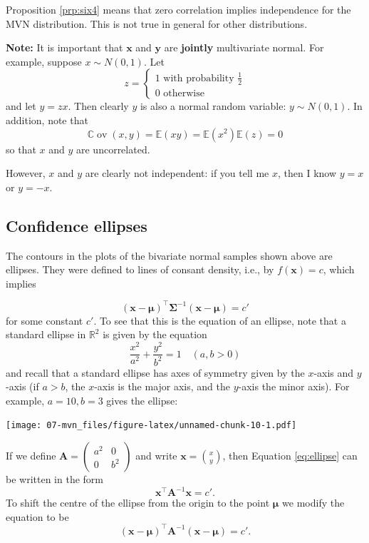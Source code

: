 \documentclass[]{book}
\theoremstyle{definition}
\theoremstyle{definition}
\theoremstyle{definition}
\theoremstyle{remark}
\begin{document}
Proposition \ref{prp:six4} means that zero correlation implies independence for the MVN distribution. This is not true in general for other distributions.

\textbf{Note:} It is important that \(\mathbf x\) and \(\mathbf y\) are \textbf{jointly} multivariate normal. For example, suppose \(x \sim N(0, 1)\). Let
\[z=\begin{cases}
1 \mbox{ with probability } \frac{1}{2}\\
0 \mbox{ otherwise}
\end{cases}
\]
and let \(y=zx\). Then clearly \(y\) is also a normal random variable: \(y \sim N(0,1)\). In addition, note that
\[{\mathbb{C}\operatorname{ov}}(x,y)= {\mathbb{E}}(xy)= {\mathbb{E}}(x^2){\mathbb{E}}(z)=0\]
so that \(x\) and \(y\) are uncorrelated.

However, \(x\) and \(y\) are clearly not independent: if you tell me \(x\), then I know \(y=x\) or \(y=-x\).

\hypertarget{confidence-ellipses}{%
\subsection{Confidence ellipses}\label{confidence-ellipses}}

The contours in the plots of the bivariate normal samples shown above are ellipses.
They were defined to lines of consant density, i.e., by \(f(\mathbf x)=c\), which implies

\begin{equation}
(\mathbf x- {\boldsymbol{\mu}})^\top \boldsymbol{\Sigma}^{-1} (\mathbf x- {\boldsymbol{\mu}})=c' \label{eq:mvnellipse}
\end{equation}
for some constant \(c'\).
To see that this is the equation of an ellipse, note that a standard ellipse in \(\mathbb{R}^2\) is given by the equation
\begin{equation}
\frac{x^2}{a^2}+\frac{y^2}{b^2}=1 \quad (a, b>0) \label{eq:ellipse}
\end{equation}
and recall that a standard ellipse has axes of symmetry given by the \(x\)-axis and \(y\)-axis
(if \(a>b\), the \(x\)-axis is the major axis, and the \(y\)-axis the minor axis). For example, \(a=10, b=3\) gives the ellipse:

\texttt{[image: 07-mvn\_files/figure-latex/unnamed-chunk-10-1.pdf]}

If we define
\({\mathbf A}=\left( \begin{array}{cc} a^2&0\\ 0&b^2 \end{array} \right)\) and write \({\mathbf x}=\binom{x}{y}\),
then Equation \eqref{eq:ellipse} can be written in the form
\[ \mathbf x^\top {\mathbf A}^{-1}\mathbf x=c'. \]
To shift the centre of the ellipse from the origin to the point \({\boldsymbol{\mu}}\) we modify the equation to be
\[ (\mathbf x-{\boldsymbol{\mu}})^\top {\mathbf A}^{-1}(\mathbf x-{\boldsymbol{\mu}}) =c'.\]
\end{document}
